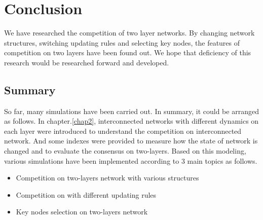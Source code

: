 
\chapter{Conclusion}
\label{chap6}
We have researched the competition of two layer networks. By changing network structures, switching updating rules and selecting key nodes, the features of competition on two layers have been found out. We hope that deficiency of this research would be researched forward and developed. 
\section{Summary}
So far, many simulations have been carried out. In summary, it could be arranged as follows. 
In chapter.\ref{chap2}, interconnected networks with different dynamics on each layer were introduced to understand the competition on interconnected network.  And some indexes were provided to measure how the state of network is changed and to evaluate the consensus on two-layers. Based on this modeling, various simulations have been implemented according to 3 main topics as follows.
\begin{itemize}
\item Competition on two-layers network with various structures
\item Competition on with different updating rules
\item Key nodes selection on two-layers network
\end{itemize}
